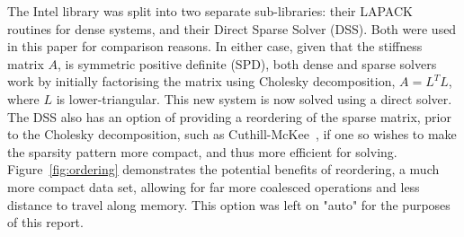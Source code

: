 The Intel library was split into two separate sub-libraries: their LAPACK routines for dense systems, and their Direct Sparse Solver (DSS). Both were used in this paper for comparison reasons. In either case, given that the stiffness matrix $A$, is symmetric positive definite (SPD), both dense and sparse solvers work by initially factorising the matrix using Cholesky decomposition, $A = L^T L$, where $L$ is lower-triangular. This new system is now solved using a direct solver. The DSS also has an option of providing a reordering of the sparse matrix, prior to the Cholesky decomposition, such as Cuthill-McKee~\cite{cutmckee}, if one so wishes to make the sparsity pattern more compact, and thus more efficient for solving. Figure~\ref{fig:ordering} demonstrates the potential benefits of reordering, a much more compact data set, allowing for far more coalesced operations and less distance to travel along memory. This option was left on "auto" for the purposes of this report.~\cite{dss}


